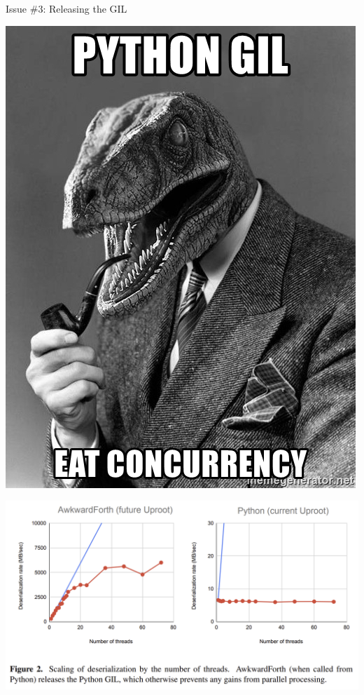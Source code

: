 \documentclass[aspectratio=169]{beamer}
\begin{document}
\begin{frame}{Issue \#3: Releasing the GIL}

\hfill \includegraphics[width=0.25\linewidth]{python-gil-eat-concurrency.jpg}

\hfill \includegraphics[width=0.5\linewidth]{awkwardforth-gil-plots.png}

\end{frame}
\end{document}
